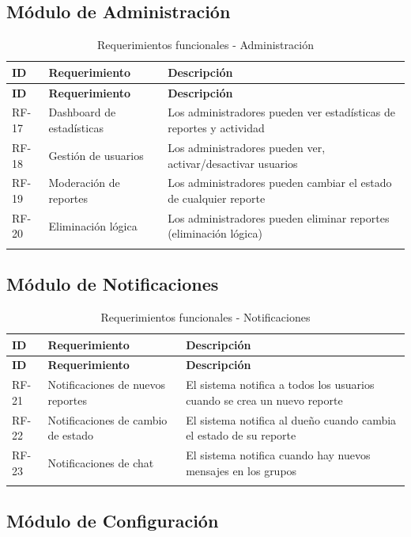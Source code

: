 \documentclass[12pt,a4paper]{article}
\begin{document}
\subsection{Módulo de Administración}

\begin{longtable}{|p{1.5cm}|p{4cm}|p{8cm}|}
\hline
\textbf{ID} & \textbf{Requerimiento} & \textbf{Descripción} \\
\hline
\endfirsthead
\hline
\textbf{ID} & \textbf{Requerimiento} & \textbf{Descripción} \\
\hline
\endhead
RF-17 & Dashboard de estadísticas & Los administradores pueden ver estadísticas de reportes y actividad \\
\hline
RF-18 & Gestión de usuarios & Los administradores pueden ver, activar/desactivar usuarios \\
\hline
RF-19 & Moderación de reportes & Los administradores pueden cambiar el estado de cualquier reporte \\
\hline
RF-20 & Eliminación lógica & Los administradores pueden eliminar reportes (eliminación lógica) \\
\hline
\caption{Requerimientos funcionales - Administración}
\end{longtable}

\subsection{Módulo de Notificaciones}

\begin{longtable}{|p{1.5cm}|p{4cm}|p{8cm}|}
\hline
\textbf{ID} & \textbf{Requerimiento} & \textbf{Descripción} \\
\hline
\endfirsthead
\hline
\textbf{ID} & \textbf{Requerimiento} & \textbf{Descripción} \\
\hline
\endhead
RF-21 & Notificaciones de nuevos reportes & El sistema notifica a todos los usuarios cuando se crea un nuevo reporte \\
\hline
RF-22 & Notificaciones de cambio de estado & El sistema notifica al dueño cuando cambia el estado de su reporte \\
\hline
RF-23 & Notificaciones de chat & El sistema notifica cuando hay nuevos mensajes en los grupos \\
\hline
\caption{Requerimientos funcionales - Notificaciones}
\end{longtable}

\subsection{Módulo de Configuración}
\end{document}
